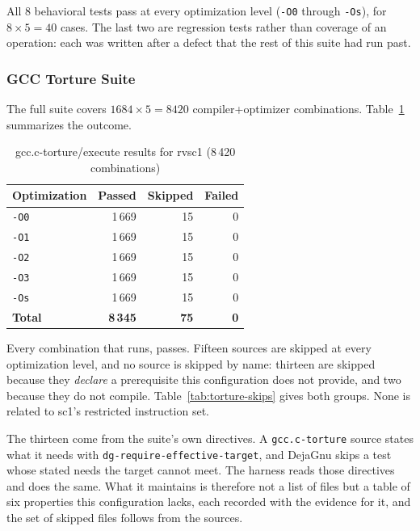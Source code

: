 All 8 behavioral tests pass at every optimization level (\texttt{-O0} through \texttt{-Os}), for
$8 \times 5 = 40$ cases. The last two are regression tests rather than coverage of an operation: each
was written after a defect that the rest of this suite had run past.

\subsubsection{GCC Torture Suite} \label{sec:sc1-torture-tests}

The full suite covers $1684 \times 5 = 8420$ compiler+optimizer combinations.
Table~\ref{tab:torture-results} summarizes the outcome.

\begin{table}[htb]
\centering
\caption{gcc.c-torture/execute results for rvsc1 (8\,420 combinations)}
\label{tab:torture-results}
\begin{tabular}{lrrr}
\toprule
\textbf{Optimization} & \textbf{Passed} & \textbf{Skipped} & \textbf{Failed} \\
\midrule
\texttt{-O0} & 1\,669 & 15 & 0 \\
\texttt{-O1} & 1\,669 & 15 & 0 \\
\texttt{-O2} & 1\,669 & 15 & 0 \\
\texttt{-O3} & 1\,669 & 15 & 0 \\
\texttt{-Os} & 1\,669 & 15 & 0 \\
\textbf{Total} & \textbf{8\,345} & \textbf{75} & \textbf{0} \\
\bottomrule
\end{tabular}
\end{table}

Every combination that runs, passes. Fifteen sources are skipped at every optimization level, and no
source is skipped by name: thirteen are skipped because they \textit{declare} a prerequisite this
configuration does not provide, and two because they do not compile.
Table~\ref{tab:torture-skips} gives both groups. None is related to sc1's restricted instruction set.

The thirteen come from the suite's own directives. A \texttt{gcc.c-torture} source states what it
needs with \texttt{dg-require-effective-target}, and DejaGnu skips a test whose stated needs the
target cannot meet. The harness reads those directives and does the same. What it maintains is
therefore not a list of files but a table of six properties this configuration lacks, each recorded
with the evidence for it, and the set of skipped files follows from the sources.

